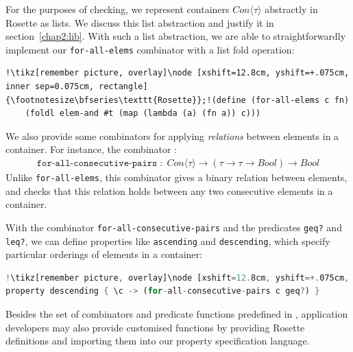 For the purposes of checking, we represent containers $\mathit{Con}\langle\tau\rangle$ abstractly in Rosette as lists. We discuss this list abstraction and justify it in section~\ref{chap2:lib}.
With such a list abstraction, we are able to straightforwardly implement our \lstinline{for-all-elems} combinator with a list fold operation:
\begin{lstlisting}[language=racket, style=boxed, label=prop:combinator-unary, escapechar=!] 
!\tikz[remember picture, overlay]\node [xshift=12.8cm, yshift=+.075cm, inner sep=0.075cm, rectangle] {\footnotesize\bfseries\texttt{Rosette}};!(define (for-all-elems c fn)
    (foldl elem-and #t (map (lambda (a) (fn a)) c)))
\end{lstlisting}

We also provide some combinators for applying \emph{relations} between elements in a container. For instance, the combinator :
\begin{align}
    \label{prop:combinator-pair}
    \texttt{for-all-consecutive-pairs}\; :\; \mathit{Con}\langle\tau\rangle \to (\tau \to \tau \to \mathit{Bool}) \to \mathit{Bool}
\end{align}
Unlike \lstinline{for-all-elems}, this combinator gives a binary relation between elements, and checks that this relation holds between any two consecutive elements in a container.

With the combinator \lstinline{for-all-consecutive-pairs} and the predicates \lstinline{geq?} and \lstinline{leq?}, we can define properties like \lstinline{ascending} and \lstinline{descending}, which specify particular orderings of elements in a container:
\begin{lstlisting}[language=Rust, style=boxed, escapechar=!]
!\tikz[remember picture, overlay]\node [xshift=12.8cm, yshift=+.075cm, inner sep=0.075cm, rectangle] {\footnotesize\bfseries\texttt{Primrose}};!property ascending { \c -> (for-all-consecutive-pairs c leq?) }
property descending { \c -> (for-all-consecutive-pairs c geq?) }
\end{lstlisting}

Besides the set of combinators and predicate functions predefined in \Primrose{}, application developers may also provide customised functions by providing Rosette definitions and importing them into our property specification language. 

